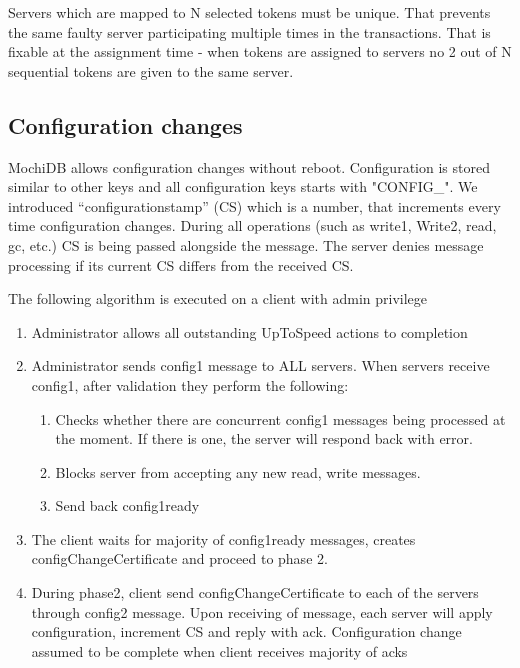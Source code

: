 \documentclass[letterpaper,twocolumn,10pt]{article}
\begin{document}
Servers which are mapped to N selected tokens must be unique. That prevents the same faulty server participating multiple times in the transactions. That is fixable at the assignment time - when tokens are assigned to servers no 2 out of N sequential tokens are given to the same server.

\subsection{Configuration changes}
MochiDB allows configuration changes without reboot. Configuration is stored similar to other keys and all configuration keys starts with "CONFIG\_". We introduced “configurationstamp” (CS) which is a number, that increments every time configuration changes. During all operations (such as write1, Write2, read, gc, etc.) CS is being passed alongside the message. The server denies message processing if its current CS differs from the received CS.

The following algorithm is executed on a client with admin privilege
\begin{enumerate}[noitemsep, topsep=0pt,]
\item Administrator allows all outstanding {UpToSpeed} actions to completion
\item Administrator sends config1 message to ALL servers. When servers receive config1, after validation they perform the following:
 \begin{enumerate}[noitemsep, topsep=0pt,]
    \item Checks whether there are concurrent config1 messages being processed at the moment. If there is one, the server will respond back with error. 
    \item Blocks server from accepting any new read, write messages.
    \item Send back config1ready
\end{enumerate}
\item The client waits for majority of config1ready messages, creates configChangeCertificate and proceed to phase 2.
\item During phase2, client send configChangeCertificate to each of the servers through config2 message. Upon receiving of message, each server will apply configuration, increment CS and reply with ack.
Configuration change assumed to be complete when client receives majority of acks
\end{enumerate}
\end{document}
